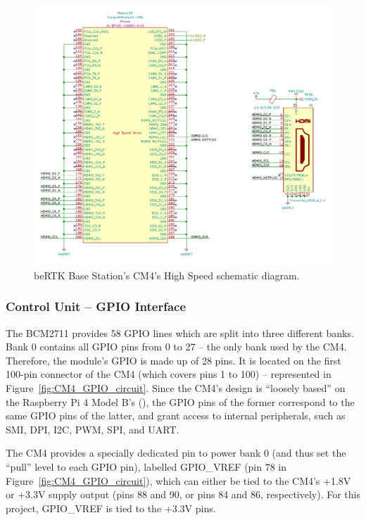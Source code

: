 \begin{figure}[h]
	\centering
	\includegraphics[width=1.0\textwidth]{Chapters/Figures/chapter3/CM4_HighSpeed.pdf}
	\caption{beRTK\textsuperscript{\textregistered} Base Station's CM4's High Speed schematic diagram.}
	\label{fig:CM4_HighSpeed_circuit}
\end{figure}


\subsubsection{Control Unit -- GPIO Interface}\label{sec:3222_CM4_GPIO}

The BCM2711 provides 58 GPIO lines which are split into three different banks. Bank 0 contains all GPIO pins from 0 to 27 -- the only bank used by the CM4. Therefore, the module's GPIO is made up of 28 pins. It is located on the first 100-pin connector of the CM4 (which covers pins 1 to 100) -- represented in Figure~\ref{fig:CM4_GPIO_circuit}. Since the CM4's design is ``loosely based'' on the Raspberry Pi 4 Model B's (\cite{CM4}), the GPIO pins of the former correspond to the same GPIO pins of the latter, and grant access to internal peripherals, such as SMI, DPI, I2C, PWM, SPI, and UART.

The CM4 provides a specially dedicated pin to power bank 0 (and thus set the ``pull'' level to each GPIO pin), labelled GPIO\_VREF (pin 78 in Figure~\ref{fig:CM4_GPIO_circuit}), which can either be tied to the CM4's +1.8V or +3.3V supply output (pins 88 and 90, or pins 84 and 86, respectively). For this project, GPIO\_VREF is tied to the +3.3V pins.

